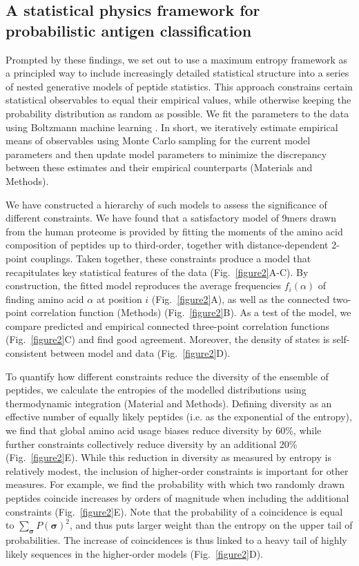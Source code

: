 \documentclass[superscriptaddress,twocolumn,pre]{revtex4}
\newcommand{\B}{\boldsymbol}
\newcommand{\<}{\langle}
\renewcommand{\>}{\rangle}
\begin{document}
\subsection{A statistical physics framework for probabilistic antigen classification} 

Prompted by these findings, we set out to use a maximum entropy framework as a principled way to include increasingly detailed statistical structure into a series of nested generative models of peptide statistics. This approach constrains certain statistical observables to equal their empirical values, while otherwise keeping the probability distribution as random as possible. We fit the parameters to the data using Boltzmann machine learning \cite{Ackley1985}. In short, we iteratively estimate empirical means of observables using Monte Carlo sampling for the current model parameters and then update model parameters to minimize the discrepancy between these estimates and their empirical counterparts (Materials and Methods).

We have constructed a hierarchy of such models to assess the significance of different constraints. We have found that a satisfactory model of 9mers drawn from the human proteome is provided by fitting the moments of the amino acid composition of peptides up to third-order, together with distance-dependent 2-point couplings. Taken together, these constraints produce a model that recapitulates key statistical features of the data (Fig.~\ref{figure2}A-C). By construction, the fitted model reproduces the average frequencies $f_i(\alpha)$ of finding amino acid $\alpha$ at position $i$ (Fig.~\ref{figure2}A), as well as the connected two-point correlation function (Methods) (Fig.~\ref{figure2}B). As a test of the model, we compare predicted and empirical connected three-point correlation functions (Fig.~\ref{figure2}C) and find good agreement. Moreover, the density of states is self-consistent between model and data (Fig.~\ref{figure2}D).

To quantify how different constraints reduce the diversity of the ensemble of peptides, we calculate the entropies  of the modelled distributions using thermodynamic integration (Material and Methods). Defining diversity as an effective number of equally likely peptides (i.e. as the exponential of the entropy), we find that global amino acid usage biases reduce diversity by 60\%, while further constraints collectively reduce diversity by an additional 20\% (Fig.~\ref{figure2}E). While this reduction in diversity as measured by entropy is relatively modest, the inclusion of higher-order constraints is important for other measures. For example, we find the probability with which two randomly drawn peptides coincide increases by orders of magnitude when including the additional constraints (Fig.~\ref{figure2}E). Note that the probability of a coincidence is equal to $\sum_{\B \sigma} P(\B \sigma)^2$, and thus puts larger weight than the entropy on the upper tail of probabilities. The increase of coincidences is thus linked to a heavy tail of highly likely sequences in the higher-order models (Fig.~\ref{figure2}D).
\end{document}
